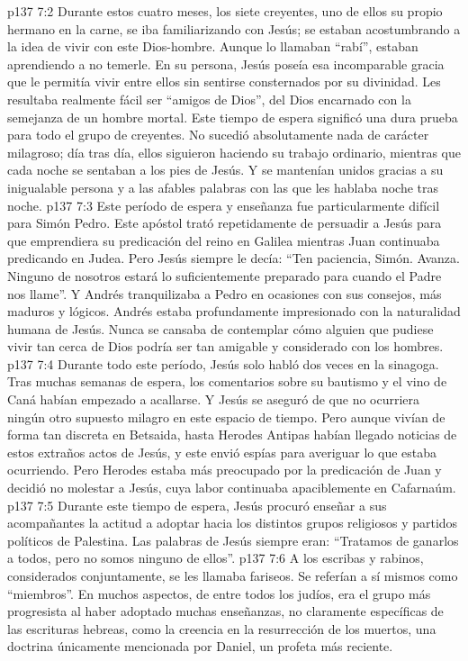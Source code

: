 \vs p137 7:2 Durante estos cuatro meses, los siete creyentes, uno de ellos su propio hermano en la carne, se iba familiarizando con Jesús; se estaban acostumbrando a la idea de vivir con este Dios\hyp{}hombre. Aunque lo llamaban “rabí”, estaban aprendiendo a no temerle. En su persona, Jesús poseía esa incomparable gracia que le permitía vivir entre ellos sin sentirse consternados por su divinidad. Les resultaba realmente fácil ser “amigos de Dios”, del Dios encarnado con la semejanza de un hombre mortal. Este tiempo de espera significó una dura prueba para todo el grupo de creyentes. No sucedió absolutamente nada de carácter milagroso; día tras día, ellos siguieron haciendo su trabajo ordinario, mientras que cada noche se sentaban a los pies de Jesús. Y se mantenían unidos gracias a su inigualable persona y a las afables palabras con las que les hablaba noche tras noche.
\vs p137 7:3 Este período de espera y enseñanza fue particularmente difícil para Simón Pedro. Este apóstol trató repetidamente de persuadir a Jesús para que emprendiera su predicación del reino en Galilea mientras Juan continuaba predicando en Judea. Pero Jesús siempre le decía: “Ten paciencia, Simón. Avanza. Ninguno de nosotros estará lo suficientemente preparado para cuando el Padre nos llame”. Y Andrés tranquilizaba a Pedro en ocasiones con sus consejos, más maduros y lógicos. Andrés estaba profundamente impresionado con la naturalidad humana de Jesús. Nunca se cansaba de contemplar cómo alguien que pudiese vivir tan cerca de Dios podría ser tan amigable y considerado con los hombres.
\vs p137 7:4 Durante todo este período, Jesús solo habló dos veces en la sinagoga. Tras muchas semanas de espera, los comentarios sobre su bautismo y el vino de Caná habían empezado a acallarse. Y Jesús se aseguró de que no ocurriera ningún otro supuesto milagro en este espacio de tiempo. Pero aunque vivían de forma tan discreta en Betsaida, hasta Herodes Antipas habían llegado noticias de estos extraños actos de Jesús, y este envió espías para averiguar lo que estaba ocurriendo. Pero Herodes estaba más preocupado por la predicación de Juan y decidió no molestar a Jesús, cuya labor continuaba apaciblemente en Cafarnaúm.
\vs p137 7:5 Durante este tiempo de espera, Jesús procuró enseñar a sus acompañantes la actitud a adoptar hacia los distintos grupos religiosos y partidos políticos de Palestina. Las palabras de Jesús siempre eran: “Tratamos de ganarlos a todos, pero no somos  ninguno de ellos”.
\vs p137 7:6 \pc A los escribas y rabinos, considerados conjuntamente, se les llamaba fariseos. Se referían a sí mismos como “miembros”. En muchos aspectos, de entre todos los judíos, era el grupo más progresista al haber adoptado muchas enseñanzas, no claramente específicas de las escrituras hebreas, como la creencia en la resurrección de los muertos, una doctrina únicamente mencionada por Daniel, un profeta más reciente.
